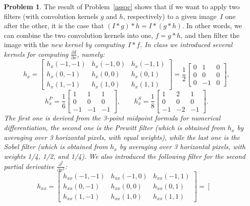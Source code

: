 \documentclass[11pt]{article}
\theoremstyle{plain}
\theoremstyle{definition}
\newtheorem{problem}{Problem}
\theoremstyle{remark}
\begin{document}
\begin{problem}
	The result of Problem~\ref{assoc} 
	shows that if we want to apply two filters
	(with convolution kernels $g$ and $h$, respectively)
	to a given image~$I$ one after the other, it is the case
	that $(I\ast g)\ast h = I\ast(g\ast h)$.
	In other words, we can combine the two convolution
	kernels into one, $f=g\ast h$, and then filter
	the image with the \em new \em kernel by computing~$I\ast f$. 
	In class we introduced several kernels for computing
	$\frac{\partial I}{\partial x}$, namely: 
	$$
	h_x = 
	\left[
	\begin{array}{ccc}
	h_x(-1,-1) & h_x(-1,0) & h_x(-1,1) \\
	h_x(0,-1) & h_x(0,0) & h_x(0,1) \\
	h_x(1,-1) & h_x(1,0) & h_x(1,1) 
	\end{array}
	\right]
	=
	\frac{1}{2}
	\left[
	\begin{array}{ccc}
	0 & 1 & 0 \\
	0 & 0 & 0 \\
	0 & -1 & 0 
	\end{array}
	\right],
	$$
	$$
	h^P_x = 
	\frac{1}{6}
	\left[
	\begin{array}{ccc}
	1 & 1 & 1 \\
	0 & 0 & 0 \\
	-1 & -1 & -1 
	\end{array}
	\right],
 	\qquad
 	h^S_x = 
 	\frac{1}{8}
 	\left[
 	\begin{array}{ccc}
 	1 & 2 & 1 \\
 	0 & 0 & 0 \\
 	-1 & -2 & -1 
 	\end{array}
 	\right].
	$$
The first one is derived from the 3-point midpoint formula
for numerical differentiation,
the second one is the \em Prewitt \em filter
(which is obtained from $h_x$ by averaging over 3
horizontal pixels, with equal weights),
while the last one is the \em Sobel \em filter
(which is obtained from $h_x$ by averaging over 3
horizontal pixels, with weights 1/4, 1/2, and 1/4).
We also introduced the following filter
for the \em second \em partial derivative
$\frac{\partial^2}{\partial x^2}$:
$$
h_{xx} 
= 
\left[
\begin{array}{ccc}
h_{xx}(-1,-1) & h_{xx}(-1,0) & h_{xx}(-1,1) \\
h_{xx}(0,-1) & h_{xx}(0,0) & h_{xx}(0,1) \\
h_{xx}(1,-1) & h_{xx}(1,0) & h_{xx}(1,1) 
\end{array}
\right]
= 
\left[
\begin{array}{ccc}

\end{array}$$
\end{problem}
\end{document}

